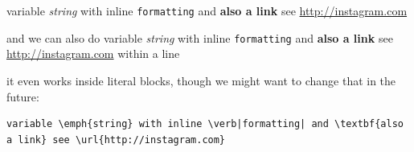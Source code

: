 
variable \emph{string} with inline \verb|formatting| and \textbf{also a link} see \url{http://instagram.com}

and we can also do variable \emph{string} with inline \verb|formatting| and \textbf{also a link} see \url{http://instagram.com} within a line

it even works inside literal blocks, though we might want to change that in the future:
\begin{verbatim}
variable \emph{string} with inline \verb|formatting| and \textbf{also a link} see \url{http://instagram.com}
\end{verbatim}